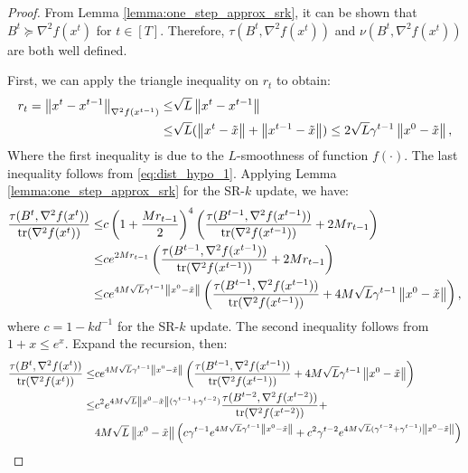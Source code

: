 \documentclass[letterpaper]{article} %
\theoremstyle{plain}
\theoremstyle{definition}
\theoremstyle{remark}
\newcommand\norm[1]{\left\lVert#1\right\rVert}
\begin{document}
\begin{proof}
    From Lemma \ref{lemma:one_step_approx_srk}, it can be shown that $B^t \succeq \nabla^2 f(x^t)$ for $t \in [T]$. Therefore, $\tau(B^t, \nabla^2 f(x^t))$ and $\nu(B^t, \nabla^2 f(x^t))$ are both well defined.

    First, we can apply the triangle inequality on $r_t$ to obtain:
    \begin{align*}
        r_t = \norm{x^t - x^{t-1}}_{\nabla^2 f(x^{t-1})} \leq & \sqrt{L} \norm{x^t - x^{t-1}} \\
        \leq & \sqrt{L}(\norm{x^t - \Tilde{x}} + \norm{x^{t-1} - \Tilde{x}}) \leq 2 \sqrt{L} \gamma^{t-1} \norm{x^0 - \Tilde{x}},
    \end{align*}
    Where the first inequality is due to the $L$-smoothness of function $f(\cdot)$. The last inequality follows from \eqref{eq:dist_hypo_1}. 
    Applying Lemma \ref{lemma:one_step_approx_srk} for the SR-$k$ update, we have:
    \begin{align*}
         \frac{\tau(B^{t}, \nabla^2 f(x^{t}))}{\mathrm{tr}(\nabla^2 f(x^{t}))} \leq & c\left(1 + \frac{M r_{t-1}}{2}\right)^4 \left(\frac{\tau (B^{t-1}, \nabla^2 f(x^{t-1}))}{\mathrm{tr}(\nabla^2 f(x^{t-1}))} + 2 M r_{t-1}  \right) \\
         \leq & c e^ {2 M r_{t-1}} \left(\frac{\tau (B^{t-1}, \nabla^2 f(x^{t-1}))}{\mathrm{tr}(\nabla^2 f(x^{t-1}))} + 2 M r_{t-1}  \right)\\
         \leq & c e^ {4 M \sqrt{L} \gamma^{t-1} \norm{x^0 - \Tilde{x}}} \left(\frac{\tau (B^{t-1}, \nabla^2 f(x^{t-1}))}{\mathrm{tr}(\nabla^2 f(x^{t-1}))} + 4 M \sqrt{L} \gamma^{t-1} \norm{x^0 - \Tilde{x}}  \right),
    \end{align*}
    where $c = 1 - k d^{-1}$ for the SR-$k$ update.
    The second inequality follows from $1 + x \leq e^x$. Expand the recursion, then:
    \begin{align*}
         \frac{\tau(B^{t}, \nabla^2 f(x^{t}))}{\mathrm{tr}(\nabla^2 f(x^{t}))} \leq & c e^ {4 M \sqrt{L} \gamma^{t-1} \norm{x^0 - \Tilde{x}}} \left(\frac{\tau (B^{t-1}, \nabla^2 f(x^{t-1}))}{\mathrm{tr}(\nabla^2 f(x^{t-1}))} + 4 M \sqrt{L} \gamma^{t-1} \norm{x^0 - \Tilde{x}}  \right) \\
         \leq & c^2 e^ {4 M \sqrt{L}  \norm{x^0 - \Tilde{x}} (\gamma^{t-1} + \gamma^{t-2})} \frac{\tau (B^{t-2}, \nabla^2 f(x^{t-2}))}{\mathrm{tr}(\nabla^2 f(x^{t-2}))} + \\
         & 4 M \sqrt{L}  \norm{x^0 - \Tilde{x}}\left( c \gamma^{t-1} e^ {4 M \sqrt{L} \gamma^{t-1} \norm{x^0 - \Tilde{x}}} + c^2 \gamma^{t-2} e^ {4 M \sqrt{L} (\gamma^{t-2} + \gamma^{t-1}) \norm{x^0 - \Tilde{x}}} \right)  \\

\end{align*}
\end{proof}
\end{document}
